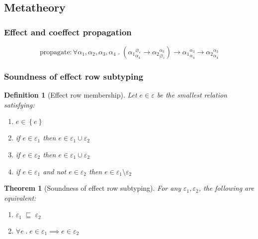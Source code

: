 \documentclass[12pt]{article}
\newtheorem{definition}{Definition}
\newtheorem{theorem}{Theorem}
\newcommand\anno[2]{#1 : #2}
\newcommand\parens[1]{\left( #1 \right)}
\newcommand\tvar{\alpha}
\newcommand\tembellished[3]{{#1}^{#2}_{#3}}
\newcommand\tarrow[2]{#1 \rightarrow #2}
\newcommand\tforall[2]{\forall #1 \; . \; #2}
\newcommand\row{\varepsilon}
\newcommand\rempty{\varnothing_{\row}}
\newcommand\rsingleton[1]{\left\{ #1 \right\}}
\newcommand\runion[2]{#1 \cup #2}
\newcommand\rdiff[2]{#1 \setminus #2}
\newcommand\effect{e}
\newcommand\contained[2]{#1 \; \sqsubseteq \; #2}
\begin{document}
    \subsection{Metatheory}

      \subsubsection{Effect and coeffect propagation}

        \[ \anno{\text{propagate}}{\tforall{\tvar_1, \tvar_2, \tvar_3, \tvar_4}{\tarrow{\parens{\tarrow{\tembellished{\tvar_1}{\rempty}{\tvar_4}}{\tembellished{\tvar_2}{\tvar_3}{\rempty}}}}{\tarrow{\tembellished{\tvar_1}{\tvar_3}{\tvar_4}}{\tembellished{\tvar_2}{\tvar_3}{\tvar_4}}}}} \]

      \subsubsection{Soundness of effect row subtyping}

        \begin{definition}[Effect row membership]
          Let $\effect \in \row$ be the smallest relation satisfying:
          \begin{enumerate}
            \item $\effect \in \rsingleton{\effect}$
            \item if $\effect \in \row_1$ then $\effect \in \runion{\row_1}{\row_2}$
            \item if $\effect \in \row_2$ then $\effect \in \runion{\row_1}{\row_2}$
            \item if $\effect \in \row_1$ and not $\effect \in \row_2$ then $\effect \in \rdiff{\row_1}{\row_2}$
          \end{enumerate}
        \end{definition}

        \begin{theorem}[Soundness of effect row subtyping]
          For any $\row_1, \row_2$, the following are equivalent:
          \begin{enumerate}
            \item $\contained{\row_1}{\row_2}$
            \item $\forall \effect \;.\; \effect \in \row_1 \implies \effect \in \row_2$
          \end{enumerate}
        \end{theorem}
\end{document}
